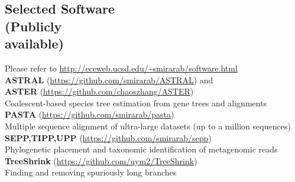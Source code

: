 \documentclass[margin,line,letterpaper]{resume}
\begin{document}
\begin{resume}
\section{\mysidestyle Selected Software\\(Publicly\\available)}
Please refer to
\url{http://eceweb.ucsd.edu/~smirarab/software.html} \vspace{2mm}\\
\textbf{ASTRAL} (\url{https://github.com/smirarab/ASTRAL}) and\\ \textbf{ASTER} (\url{https://github.com/chaoszhang/ASTER})\\
Coalescent-based species tree estimation from  gene trees and alignments\vspace{1.5mm}\\
\textbf{PASTA} (\url{https://github.com/smirarab/pasta})\\ 
Multiple sequence alignment of ultra-large datasets (up to a million sequences)\vspace{1.5mm}\\
\textbf{SEPP,TIPP,UPP} (\url{https://github.com/smirarab/sepp})\\
Phylogenetic placement and taxonomic identification of metagenomic reads\vspace{1.5mm}\\
\textbf{TreeShrink} (\url{https://github.com/uym2/TreeShrink})\\
Finding and removing spuriously long branches\vspace{1.5mm}\\

\end{resume}
\end{document}
